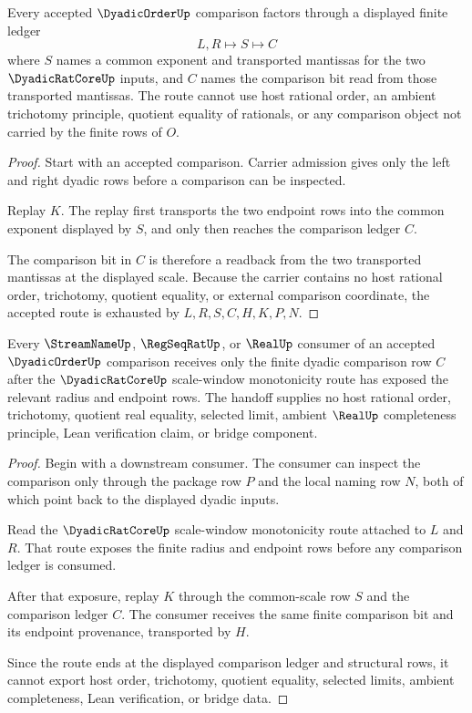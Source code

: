 \begin{theorem}
\label{thm:dyadic-order-common-scale-comparison}
Every accepted $\DyadicOrderUp$ comparison factors through a displayed finite ledger
$$
L,R \longmapsto S \longmapsto C
$$
where $S$ names a common exponent and transported mantissas for the two $\DyadicRatCoreUp$ inputs, and $C$ names the comparison bit read from those transported mantissas. The route cannot use host rational order, an ambient trichotomy principle, quotient equality of rationals, or any comparison object not carried by the finite rows of $O$.
\end{theorem}
\begin{proof}
Start with an accepted comparison. Carrier admission gives only the left and right dyadic rows before a comparison can be inspected.

Replay $K$. The replay first transports the two endpoint rows into the common exponent displayed by $S$, and only then reaches the comparison ledger $C$.

The comparison bit in $C$ is therefore a readback from the two transported mantissas at the displayed scale. Because the carrier contains no host rational order, trichotomy, quotient equality, or external comparison coordinate, the accepted route is exhausted by $L,R,S,C,H,K,P,N$.
\end{proof}

\begin{theorem}
\label{thm:dyadic-order-radius-monotonicity-handoff}
Every $\StreamNameUp$, $\RegSeqRatUp$, or $\RealUp$ consumer of an accepted $\DyadicOrderUp$ comparison receives only the finite dyadic comparison row $C$ after the $\DyadicRatCoreUp$ scale-window monotonicity route has exposed the relevant radius and endpoint rows. The handoff supplies no host rational order, trichotomy, quotient real equality, selected limit, ambient $\RealUp$ completeness principle, Lean verification claim, or bridge component.
\end{theorem}
\begin{proof}
Begin with a downstream consumer. The consumer can inspect the comparison only through the package row $P$ and the local naming row $N$, both of which point back to the displayed dyadic inputs.

Read the $\DyadicRatCoreUp$ scale-window monotonicity route attached to $L$ and $R$. That route exposes the finite radius and endpoint rows before any comparison ledger is consumed.

After that exposure, replay $K$ through the common-scale row $S$ and the comparison ledger $C$. The consumer receives the same finite comparison bit and its endpoint provenance, transported by $H$.

Since the route ends at the displayed comparison ledger and structural rows, it cannot export host order, trichotomy, quotient equality, selected limits, ambient completeness, Lean verification, or bridge data.
\end{proof}

